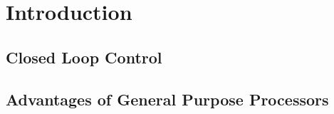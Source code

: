 \chapter{Introduction}
\label{chap:introduction}

\begin{comment}
FPGA expensive, slow and takes long to develop
RaspberryPi cheap and has hardware acceleration for SPI and PWM
Rust as new language competitive to C?
Bare-metal still necessary with modern Microprocessors and Real-time Linux?

Closed loop control not a new problem
better results the higher the control frequency
Can we build a fast control loop while staying on Linux?
\end{comment}

\section{Closed Loop Control}

\section{Advantages of General Purpose Processors}

\section{}
